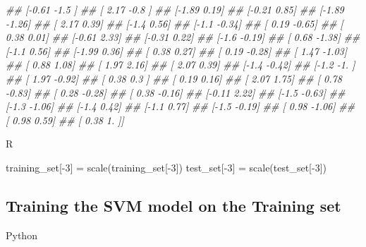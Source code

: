 \documentclass[
]{book}
\newenvironment{Shaded}{\begin{snugshade}}{\end{snugshade}}
\newcommand{\CommentTok}[1]{\textcolor[rgb]{0.56,0.35,0.01}{\textit{#1}}}
\newcommand{\DecValTok}[1]{\textcolor[rgb]{0.00,0.00,0.81}{#1}}
\newcommand{\FunctionTok}[1]{\textcolor[rgb]{0.00,0.00,0.00}{#1}}
\newcommand{\NormalTok}[1]{#1}
\newcommand{\OtherTok}[1]{\textcolor[rgb]{0.56,0.35,0.01}{#1}}
\newcommand{\SpecialCharTok}[1]{\textcolor[rgb]{0.00,0.00,0.00}{#1}}
\theoremstyle{definition}
\theoremstyle{definition}
\theoremstyle{definition}
\theoremstyle{definition}
\theoremstyle{remark}
\begin{document}
\begin{Shaded}
\begin{Highlighting}[]
\CommentTok{\#\#  [{-}0.61 {-}1.5 ]}
\CommentTok{\#\#  [ 2.17 {-}0.8 ]}
\CommentTok{\#\#  [{-}1.89  0.19]}
\CommentTok{\#\#  [{-}0.21  0.85]}
\CommentTok{\#\#  [{-}1.89 {-}1.26]}
\CommentTok{\#\#  [ 2.17  0.39]}
\CommentTok{\#\#  [{-}1.4   0.56]}
\CommentTok{\#\#  [{-}1.1  {-}0.34]}
\CommentTok{\#\#  [ 0.19 {-}0.65]}
\CommentTok{\#\#  [ 0.38  0.01]}
\CommentTok{\#\#  [{-}0.61  2.33]}
\CommentTok{\#\#  [{-}0.31  0.22]}
\CommentTok{\#\#  [{-}1.6  {-}0.19]}
\CommentTok{\#\#  [ 0.68 {-}1.38]}
\CommentTok{\#\#  [{-}1.1   0.56]}
\CommentTok{\#\#  [{-}1.99  0.36]}
\CommentTok{\#\#  [ 0.38  0.27]}
\CommentTok{\#\#  [ 0.19 {-}0.28]}
\CommentTok{\#\#  [ 1.47 {-}1.03]}
\CommentTok{\#\#  [ 0.88  1.08]}
\CommentTok{\#\#  [ 1.97  2.16]}
\CommentTok{\#\#  [ 2.07  0.39]}
\CommentTok{\#\#  [{-}1.4  {-}0.42]}
\CommentTok{\#\#  [{-}1.2  {-}1.  ]}
\CommentTok{\#\#  [ 1.97 {-}0.92]}
\CommentTok{\#\#  [ 0.38  0.3 ]}
\CommentTok{\#\#  [ 0.19  0.16]}
\CommentTok{\#\#  [ 2.07  1.75]}
\CommentTok{\#\#  [ 0.78 {-}0.83]}
\CommentTok{\#\#  [ 0.28 {-}0.28]}
\CommentTok{\#\#  [ 0.38 {-}0.16]}
\CommentTok{\#\#  [{-}0.11  2.22]}
\CommentTok{\#\#  [{-}1.5  {-}0.63]}
\CommentTok{\#\#  [{-}1.3  {-}1.06]}
\CommentTok{\#\#  [{-}1.4   0.42]}
\CommentTok{\#\#  [{-}1.1   0.77]}
\CommentTok{\#\#  [{-}1.5  {-}0.19]}
\CommentTok{\#\#  [ 0.98 {-}1.06]}
\CommentTok{\#\#  [ 0.98  0.59]}
\CommentTok{\#\#  [ 0.38  1.  ]]}
\end{Highlighting}
\end{Shaded}

R

\begin{Shaded}
\begin{Highlighting}[]
\NormalTok{training\_set[}\SpecialCharTok{{-}}\DecValTok{3}\NormalTok{] }\OtherTok{=} \FunctionTok{scale}\NormalTok{(training\_set[}\SpecialCharTok{{-}}\DecValTok{3}\NormalTok{])}
\NormalTok{test\_set[}\SpecialCharTok{{-}}\DecValTok{3}\NormalTok{] }\OtherTok{=} \FunctionTok{scale}\NormalTok{(test\_set[}\SpecialCharTok{{-}}\DecValTok{3}\NormalTok{])}
\end{Highlighting}
\end{Shaded}

\hypertarget{training-the-svm-model-on-the-training-set}{%
\subsection{Training the SVM model on the Training set}\label{training-the-svm-model-on-the-training-set}}

Python
\end{document}
